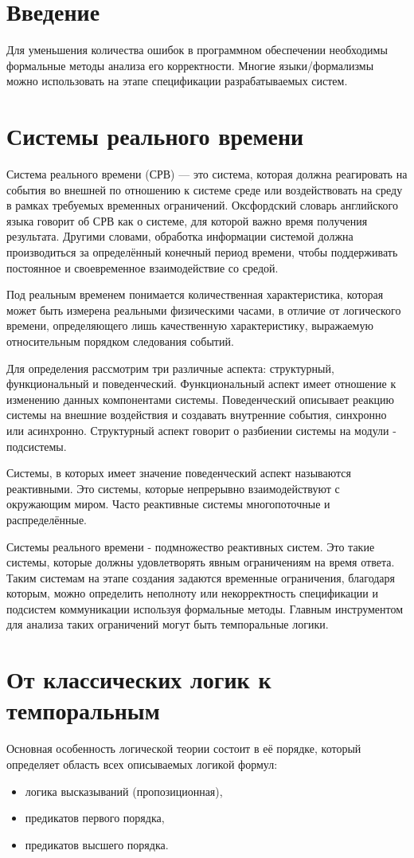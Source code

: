 	\section{Введение}
	Для уменьшения количества ошибок в программном обеспечении необходимы формальные методы анализа его корректности.
	Многие языки/формализмы можно использовать на этапе спецификации разрабатываемых систем.
	
	
	\section{Системы реального времени}
		Система реального времени (СРВ) — это система, которая должна реагировать на события во внешней по отношению к системе среде или воздействовать на среду в рамках требуемых временных ограничений. 
		Оксфордский словарь английского языка говорит об СРВ как о системе, для которой важно время получения результата. 
		Другими словами, обработка информации системой должна производиться за определённый конечный период времени, чтобы поддерживать постоянное и своевременное взаимодействие со средой.
		
		Под реальным временем понимается количественная характеристика, которая может быть измерена реальными физическими часами, в отличие от логического времени, определяющего лишь качественную характеристику, выражаемую относительным порядком следования событий. 
		
		Для определения рассмотрим три различные аспекта: структурный, функциональный и поведенческий. 
		Функциональный аспект имеет отношение к изменению данных компонентами системы. 
		Поведенческий описывает реакцию системы на внешние воздействия и создавать внутренние события, синхронно или асинхронно.
		Структурный аспект говорит о разбиении системы на модули - подсистемы.
		
		Системы, в которых имеет значение поведенческий аспект называются реактивными. 
		Это системы, которые непрерывно взаимодействуют с окружающим миром.
		Часто реактивные системы многопоточные и распределённые. 
		
		Системы реального времени - подмножество реактивных систем.
		Это такие системы, которые должны удовлетворять явным ограничениям на время ответа.
		Таким системам на этапе создания задаются временные ограничения, благодаря которым, можно определить неполноту или некорректность спецификации и подсистем коммуникации используя формальные методы.
		Главным инструментом для анализа таких ограничений могут быть темпоральные логики.
	\section{От классических логик к темпоральным}
		Основная особенность логической теории состоит в её порядке, который определяет область всех описываемых логикой формул:
		\begin{itemize}
			\item логика высказываний (пропозиционная),
			\item предикатов первого порядка,
			\item предикатов высшего порядка.
		\end{itemize}
		
